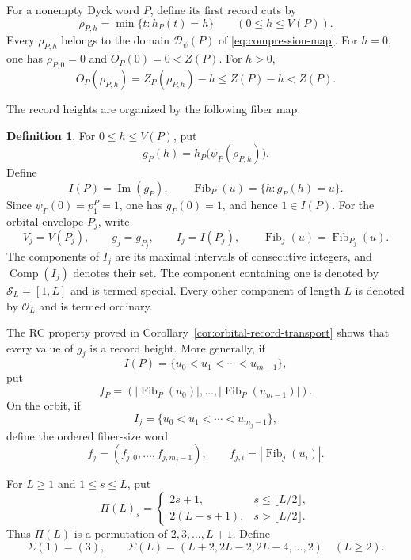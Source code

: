 \documentclass[11pt]{article}
\theoremstyle{definition}
\newtheorem{definition}[theorem]{Definition}
\theoremstyle{remark}
\DeclareMathOperator{\Img}{Im}
\DeclareMathOperator{\Comp}{Comp}
\begin{document}
For a nonempty Dyck word \(P\), define its first record cuts by
\[
 \rho_{P,h}=\min\{t:h_P(t)=h\}
 \qquad(0\leq h\leq V(P)).
\]
Every \(\rho_{P,h}\) belongs to the domain \(\mathcal D_\psi(P)\) of
\eqref{eq:compression-map}.  For \(h=0\), one has
\(\rho_{P,0}=0\) and \(O_P(0)=0<Z(P)\).  For \(h>0\),
\[
 O_P(\rho_{P,h})=Z_P(\rho_{P,h})-h
 \leq Z(P)-h<Z(P).
\]

The record heights are organized by the following fiber map.
\begin{definition}
For \(0\leq h\leq V(P)\), put
\begin{equation*}
 g_P(h)=h_P\bigl(\psi_P(\rho_{P,h})\bigr).
\end{equation*}
Define
\[
 I(P)=\Img(g_P),
 \qquad
 \operatorname{Fib}_P(u)=\{h:g_P(h)=u\}.
\]
Since \(\psi_P(0)=p^P_1=1\), one has \(g_P(0)=1\), and hence \(1\in I(P)\).
For the orbital envelope \(P_j\), write
\[
 V_j=V(P_j),
 \qquad g_j=g_{P_j},
 \qquad I_j=I(P_j),
 \qquad \operatorname{Fib}_j(u)=\operatorname{Fib}_{P_j}(u).
\]
The components of \(I_j\) are its maximal intervals of consecutive integers,
and \(\Comp(I_j)\) denotes their set.
The component containing one is denoted by \(\mathcal S_L=[1,L]\) and is
termed special.  Every other component of length \(L\) is denoted by
\(\mathcal O_L\) and is termed ordinary.
\end{definition}

The RC property proved in Corollary~\ref{cor:orbital-record-transport} shows
that every value of \(g_j\) is a record height.  More generally, if
\[
 I(P)=\{u_0<u_1<\cdots<u_{m-1}\},
\]
put
\[
 f_P=(|\operatorname{Fib}_P(u_0)|,\ldots,
 |\operatorname{Fib}_P(u_{m-1})|).
\]
On the orbit, if
\[
 I_j=\{u_0<u_1<\cdots<u_{m_j-1}\},
\]
define the ordered fiber-size word
\begin{equation*}
 f_j=(f_{j,0},\ldots,f_{j,m_j-1}),
 \qquad f_{j,i}=|\operatorname{Fib}_j(u_i)|.
\end{equation*}

For \(L\geq1\) and \(1\leq s\leq L\), put
\begin{equation}
\label{eq:Pi}
 \Pi(L)_s=
 \begin{cases}
 2s+1,&s\leq\lfloor L/2\rfloor,\\
 2(L-s+1),&s>\lfloor L/2\rfloor.
 \end{cases}
\end{equation}
Thus \(\Pi(L)\) is a permutation of \(2,3,\ldots,L+1\).  Define
\begin{equation*}
 \Sigma(1)=(3),
 \qquad
 \Sigma(L)=(L+2,2L-2,2L-4,\ldots,2)\quad(L\geq2).
\end{equation*}
\end{document}
